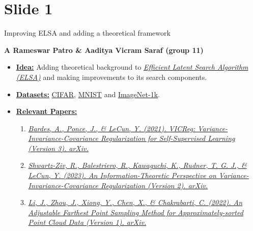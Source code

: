 \documentclass[10pt, xcolor=x11names,compress]{beamer}
\begin{document}
\section{Slide 1}
\begin{frame}[label=Background]{\centerline {Improving ELSA and adding a theoretical framework}}
\begin{center}
    \textbf{A Rameswar Patro \& Aaditya Vicram Saraf (group 11)}
\end{center}
\begin{itemize}
    \item \underline{\textbf{Idea:}} Adding theoretical background to \href{https://openreview.net/forum?id=jFiFmHrIfD}{\textit{Efficient Latent Search Algorithm (ELSA)}} and making improvements to its search components.
    \item \underline{\textbf{Datasets:}} \href{https://www.cs.toronto.edu/~kriz/cifar.html}{CIFAR}, \href{http://yann.lecun.com/exdb/mnist/}{MNIST} and \href{https://www.image-net.org/download.php}{ImageNet-1k}.    
    \item \underline{\textbf{Relevant Papers:}}
              \begin{enumerate}
              \scriptsize
                  \item \href{https://doi.org/10.48550/ARXIV.2105.04906}{\textit{Bardes, A., Ponce, J., \& LeCun, Y. (2021). VICReg: Variance-Invariance-Covariance Regularization for Self-Supervised Learning (Version 3). arXiv.}}
                  \item \href{https://doi.org/10.48550/arXiv.2303.00633}{\textit{Shwartz-Ziv, R., Balestriero, R., Kawaguchi, K., Rudner, T. G. J., \& LeCun, Y. (2023). An Information-Theoretic Perspective on Variance-Invariance-Covariance Regularization (Version 2). arXiv.}}
                  \item \href{https://doi.org/10.48550/arXiv.2208.08795}{\textit {Li, J., Zhou, J., Xiong, Y., Chen, X., \& Chakrabarti, C. (2022). An Adjustable Farthest Point Sampling Method for Approximately-sorted Point Cloud Data (Version 1). arXiv.}}
              \end{enumerate}    
\end{itemize} 
\end{frame}
\end{document}
